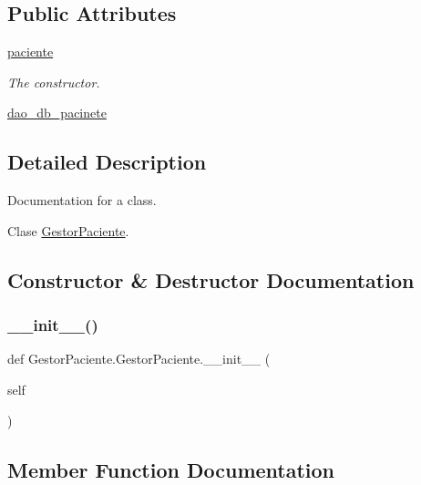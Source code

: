 \subsection*{Public Attributes}
\begin{DoxyCompactItemize}
\item 
\mbox{\hyperlink{class_gestor_paciente_1_1_gestor_paciente_a99f4445d5dc336acbb8df1c8c273a019}{paciente}}
\begin{DoxyCompactList}\small\item\em The constructor. \end{DoxyCompactList}\item 
\mbox{\hyperlink{class_gestor_paciente_1_1_gestor_paciente_af985b307324e1ed89c05c771af5cd30f}{dao\+\_\+db\+\_\+pacinete}}
\end{DoxyCompactItemize}


\subsection{Detailed Description}
Documentation for a class. 

Clase \mbox{\hyperlink{class_gestor_paciente_1_1_gestor_paciente}{Gestor\+Paciente}}. 

\subsection{Constructor \& Destructor Documentation}
\mbox{\label{class_gestor_paciente_1_1_gestor_paciente_a2950c017c2b347572c1fb0d203c3d995}} 
\subsubsection{\texorpdfstring{\+\_\+\+\_\+init\+\_\+\+\_\+()}{\_\_init\_\_()}}
{\footnotesize\ttfamily def Gestor\+Paciente.\+Gestor\+Paciente.\+\_\+\+\_\+init\+\_\+\+\_\+ (\begin{DoxyParamCaption}\item[{}]{self }\end{DoxyParamCaption})}



\subsection{Member Function Documentation}
\mbox{\label{class_gestor_paciente_1_1_gestor_paciente_a67e9a245c2ce693274b26295f9fdfd46}} 
